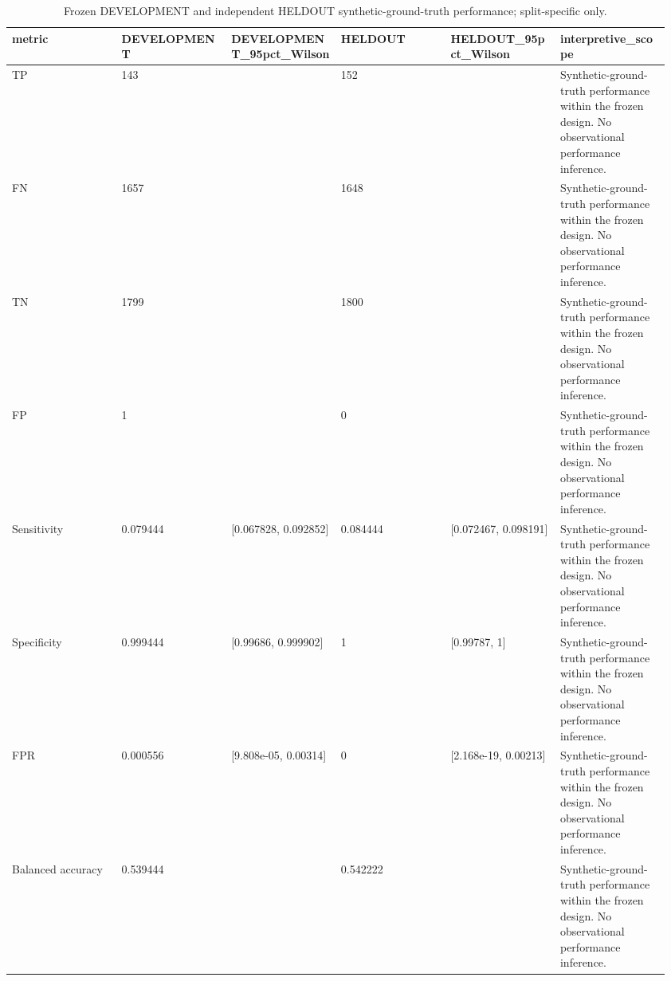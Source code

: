 \begin{table}[t]
\centering
\small
\caption{Frozen DEVELOPMENT and independent HELDOUT synthetic-ground-truth performance; split-specific only.}
\label{tab:m1\_synthetic\_performance}
\begin{tabular}{p{0.16\linewidth}p{0.16\linewidth}p{0.16\linewidth}p{0.16\linewidth}p{0.16\linewidth}p{0.16\linewidth}}
\hline
\textbf{metric} & \textbf{DEVELOPMENT} & \textbf{DEVELOPMENT\_95pct\_Wilson} & \textbf{HELDOUT} & \textbf{HELDOUT\_95pct\_Wilson} & \textbf{interpretive\_scope} \\
\hline
TP & 143 &  & 152 &  & Synthetic-ground-truth performance within the frozen design. No observational performance inference. \\
FN & 1657 &  & 1648 &  & Synthetic-ground-truth performance within the frozen design. No observational performance inference. \\
TN & 1799 &  & 1800 &  & Synthetic-ground-truth performance within the frozen design. No observational performance inference. \\
FP & 1 &  & 0 &  & Synthetic-ground-truth performance within the frozen design. No observational performance inference. \\
Sensitivity & 0.079444 & [0.067828, 0.092852] & 0.084444 & [0.072467, 0.098191] & Synthetic-ground-truth performance within the frozen design. No observational performance inference. \\
Specificity & 0.999444 & [0.99686, 0.999902] & 1 & [0.99787, 1] & Synthetic-ground-truth performance within the frozen design. No observational performance inference. \\
FPR & 0.000556 & [9.808e-05, 0.00314] & 0 & [2.168e-19, 0.00213] & Synthetic-ground-truth performance within the frozen design. No observational performance inference. \\
Balanced accuracy & 0.539444 &  & 0.542222 &  & Synthetic-ground-truth performance within the frozen design. No observational performance inference. \\
\hline
\end{tabular}
\end{table}
